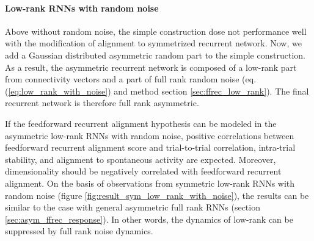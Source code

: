 \documentclass[11pt]{article}
\begin{document}
	\paragraph{Low-rank RNNs with random noise}
	Above without random noise, the simple construction dose not performance well with the modification of alignment to symmetrized recurrent network. Now, we add a Gaussian distributed asymmetric random part to the simple construction. As a result, the asymmetric recurrent network is composed of a low-rank part from connectivity vectors and a part of full rank random noise (eq. (\ref{eq:low_rank_with_noise}) and method section \ref{sec:ffrec_low_rank}). The final recurrent network is therefore full rank asymmetric. 
	
	If the feedforward recurrent alignment hypothesis can be modeled in the asymmetric low-rank RNNs with random noise, positive correlations between feedforward recurrent alignment score and trial-to-trial correlation, intra-trial stability, and alignment to spontaneous activity are expected. Moreover, dimensionality should be negatively correlated with feedforward recurrent alignment. On the basis of observations from symmetric low-rank RNNs with random noise (figure \ref{fig:result_sym_low_rank_with_noise}), the results can be similar to the case with general asymmetric full rank RNNs (section \ref{sec:asym_ffrec_response}). In other words, the dynamics of low-rank can be suppressed by full rank noise dynamics.  
	
\end{document}
